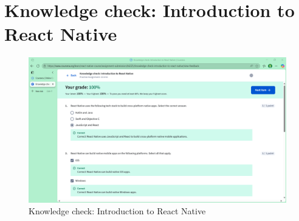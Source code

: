\section{Knowledge check: Introduction to React Native}
\begin{figure}[H]
    \centering
    \includegraphics[width=0.5\linewidth]{images/knowledge-checking-1.pdf}
    \caption{Knowledge check: Introduction to React Native}
\end{figure}